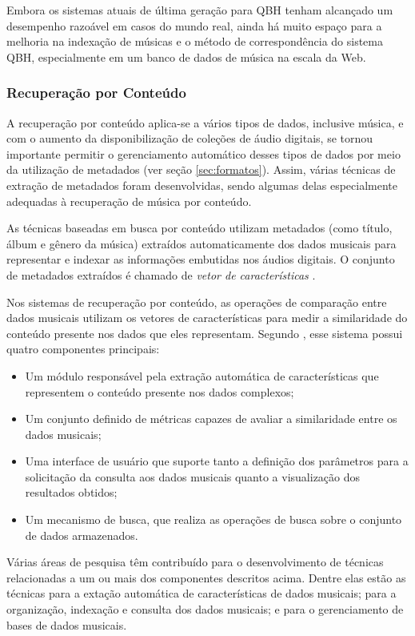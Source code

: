 Embora os sistemas atuais de última geração para QBH tenham alcançado um desempenho razoável em casos do mundo real, ainda há muito espaço para a melhoria na indexação de músicas e o método de correspondência do sistema QBH, especialmente em um banco de dados de música na escala da Web.

\subsubsection{Recuperação por Conteúdo} \label{subsubsec:rpc}
A recuperação por conteúdo aplica-se a vários tipos de dados, inclusive música, e com o aumento da disponibilização de coleções de áudio digitais, se tornou importante permitir o gerenciamento automático desses tipos de dados por meio da utilização de metadados (ver seção \ref{sec:formatos}). Assim, várias técnicas de extração de metadados foram desenvolvidas, sendo algumas delas especialmente adequadas à recuperação de música por conteúdo.

As técnicas baseadas em busca por conteúdo utilizam metadados (como título, álbum e gênero da música) extraídos automaticamente dos dados musicais para representar e indexar as informações embutidas nos áudios digitais. O conjunto de metadados extraídos é chamado de \textit{vetor de características} \cite{tzanetakis2002}.

Nos sistemas de recuperação por conteúdo, as operações de comparação entre dados musicais utilizam os vetores de características para medir a similaridade do conteúdo presente nos dados que eles representam. Segundo , esse sistema possui quatro componentes principais:

\begin{itemize}
    \item Um módulo responsável pela extração automática de características que representem o conteúdo presente nos dados complexos;
    \item Um conjunto definido de métricas capazes de avaliar a similaridade entre os dados musicais;
    \item Uma interface de usuário que suporte tanto a definição dos parâmetros para a solicitação da consulta aos dados musicais quanto a visualização dos resultados obtidos;
    \item Um mecanismo de busca, que realiza as operações de busca sobre o conjunto de dados armazenados.
\end{itemize}

Várias áreas de pesquisa têm contribuído para o desenvolvimento de técnicas relacionadas a um ou mais dos componentes descritos acima. Dentre elas estão as técnicas para a extação automática de características de dados musicais; para a organização, indexação e consulta dos dados musicais; e para o gerenciamento de bases de dados musicais.


